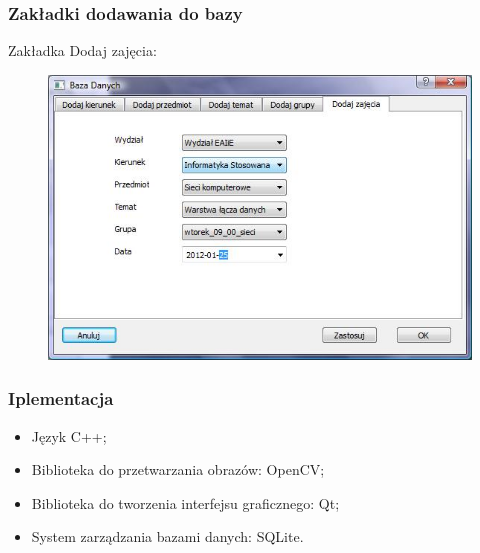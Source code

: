\documentclass{beamer}
\begin{document}
\begin{frame}
\frametitle{Zakładki dodawania do bazy}

Zakładka Dodaj zajęcia:
\begin{figure}
\includegraphics{dodaj_zajecia.jpg}
\end{figure}
\end{frame}

\begin{frame}
\frametitle{Iplementacja}
\begin{itemize}
\item Język C++;
\item Biblioteka do przetwarzania obrazów: OpenCV;
\item Biblioteka do tworzenia interfejsu graficznego: Qt;
\item System zarządzania bazami danych: SQLite.
\end{itemize}
\end{frame}

\end{document}
